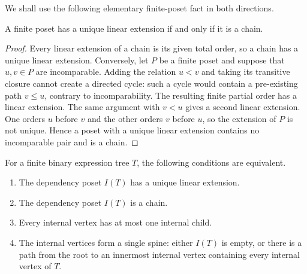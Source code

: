 We shall use the following elementary finite-poset fact in both directions.

\begin{lemma}
\label{lem:unique-linear-extension}
A finite poset has a unique linear extension if and only if it is a chain.
\end{lemma}

\begin{proof}
Every linear extension of a chain is its given total order, so a chain has a
unique linear extension.  Conversely, let $P$ be a finite poset and suppose
that $u,v\in P$ are incomparable.  Adding the relation $u<v$ and taking its
transitive closure cannot create a directed cycle: such a cycle would contain
a pre-existing path $v\leq u$, contrary to incomparability.  The resulting
finite partial order has a linear extension.  The same argument with $v<u$
gives a second linear extension.  One orders $u$ before $v$ and the other
orders $v$ before $u$, so the extension of $P$ is not unique.  Hence a poset
with a unique linear extension contains no incomparable pair and is a chain.
\end{proof}

\begin{theorem}
\label{thm:sequential-tree-classification}
For a finite binary expression tree $T$, the following conditions are
equivalent.
\begin{enumerate}
  \item The dependency poset $I(T)$ has a unique linear extension.
  \item The dependency poset $I(T)$ is a chain.
  \item Every internal vertex has at most one internal child.
  \item The internal vertices form a single spine: either $I(T)$ is empty, or
  there is a path from the root to an innermost internal vertex containing
  every internal vertex of $T$.
\end{enumerate}
\end{theorem}

